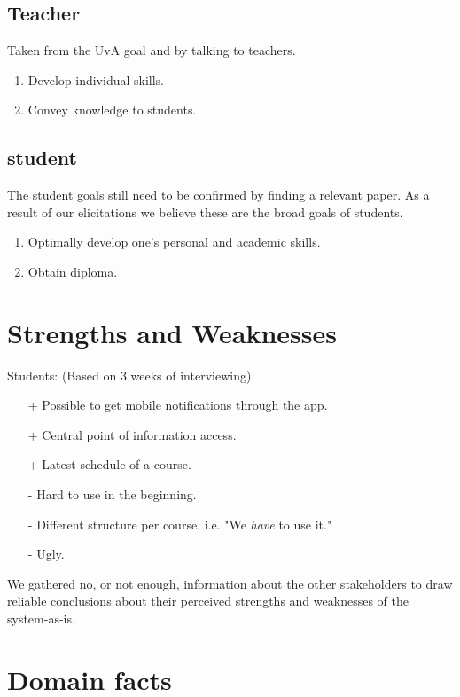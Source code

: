 \subsection{Teacher}
Taken from the UvA goal and by talking to teachers.
\begin{enumerate}
	\item Develop individual skills.
	\item Convey knowledge to students.
\end{enumerate}

\subsection{student}
The student goals still need to be confirmed by finding a relevant paper. As a result of our elicitations we believe these are the broad goals of students.
\begin{enumerate}
	\item Optimally develop one's personal and academic skills.	
	\item Obtain diploma.
\end{enumerate}

\section{Strengths and Weaknesses}
Students: (Based on 3 weeks of interviewing)
\begin{itemize}
	\item[+] Possible to get mobile notifications through the app.
    \item[+] Central point of information access.
	\item[+] Latest schedule of a course.
	\item[-] Hard to use in the beginning.
	\item[-] Different structure per course.
  i.e. "We \textit{have} to use it."
	\item[-] Ugly.
\end{itemize}

We gathered no, or not enough, information about the other stakeholders to draw reliable conclusions about their perceived strengths and weaknesses of the system-as-is.


\section{Domain facts}
\label{domain_facts}
                                                        

